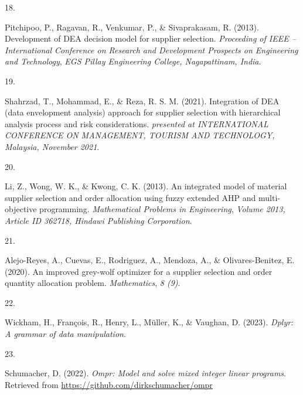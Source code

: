 \documentclass[preprint, 3p,
authoryear]{elsarticle} %
\newlength{\cslhangindent}
\newlength{\csllabelwidth}
\newlength{\cslentryspacingunit} %
\newenvironment{CSLReferences}[2] %
 {%
  \setlength{\parindent}{0pt}
  \ifodd #1
  \let\oldpar\par
  \def\par{\hangindent=\cslhangindent\oldpar}
  \fi
  \setlength{\parskip}{#2\cslentryspacingunit}
 }%
 {}
\newcommand{\CSLLeftMargin}[1]{\parbox[t]{\csllabelwidth}{#1}}
\newcommand{\CSLRightInline}[1]{\parbox[t]{\linewidth - \csllabelwidth}{#1}\break}
\begin{document}
\begin{CSLReferences}{0}{0}
\leavevmode{}%
\CSLLeftMargin{18. }%
\CSLRightInline{Pitchipoo, P., Ragavan, R., Venkumar, P., \&
Sivaprakasam, R. (2013). Development of DEA decision model for supplier
selection. \emph{Proceeding of IEEE -- International Conference on
Research and Development Prospects on Engineering and Technology},
\emph{EGS Pillay Engineering College, Nagapattinam, India}.}

\leavevmode{}%
\CSLLeftMargin{19. }%
\CSLRightInline{Shahrzad, T., Mohammad, E., \& Reza, R. S. M. (2021).
Integration of DEA (data envelopment analysis) approach for supplier
selection with hierarchical analysis process and risk considerations.
\emph{presented at INTERNATIONAL CONFERENCE ON MANAGEMENT, TOURISM AND
TECHNOLOGY, Malaysia, November 2021}.}

\leavevmode{}%
\CSLLeftMargin{20. }%
\CSLRightInline{Li, Z., Wong, W. K., \& Kwong, C. K. (2013). An
integrated model of material supplier selection and order allocation
using fuzzy extended AHP and multi-objective programming.
\emph{Mathematical Problems in Engineering}, \emph{Volume 2013, Article
ID 362718, Hindawi Publishing Corporation}.}

\leavevmode{}%
\CSLLeftMargin{21. }%
\CSLRightInline{Alejo-Reyes, A., Cuevas, E., Rodriguez, A., Mendoza, A.,
\& Olivares-Benitez, E. (2020). An improved grey-wolf optimizer for a
supplier selection and order quantity allocation problem.
\emph{Mathematics}, \emph{8 (9)}.}

\leavevmode{}%
\CSLLeftMargin{22. }%
\CSLRightInline{Wickham, H., François, R., Henry, L., Müller, K., \&
Vaughan, D. (2023). \emph{Dplyr: A grammar of data manipulation}.}

\leavevmode{}%
\CSLLeftMargin{23. }%
\CSLRightInline{Schumacher, D. (2022). \emph{Ompr: Model and solve mixed
integer linear programs}. Retrieved from
\url{https://github.com/dirkschumacher/ompr}}

\end{CSLReferences}
\end{document}
